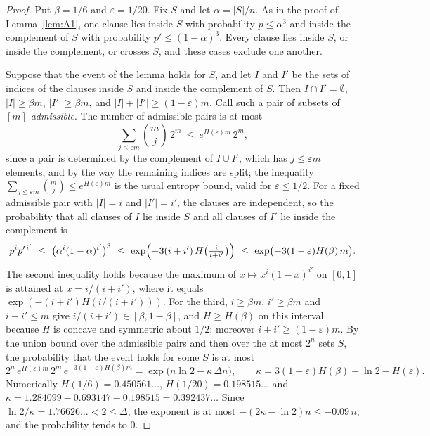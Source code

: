 \documentclass[11pt,a4paper]{article}
\theoremstyle{definition}
\theoremstyle{remark}
\begin{document}
\begin{proof}
Put $\beta=1/6$ and $\varepsilon=1/20$. Fix $S$ and let $\alpha=|S|/n$. As in the proof of
Lemma~\ref{lem:A1}, one clause lies inside $S$ with probability $p\le\alpha^3$ and inside
the complement of $S$ with probability $p'\le(1-\alpha)^3$. Every clause lies inside $S$,
or inside the complement, or crosses $S$, and these cases exclude one another.

Suppose that the event of the lemma holds for $S$, and let $I$ and $I'$ be the sets of
indices of the clauses inside $S$ and inside the complement of $S$. Then $I\cap I'=\emptyset$,
$|I|\ge\beta m$, $|I'|\ge\beta m$, and $|I|+|I'|\ge(1-\varepsilon)m$. Call such a pair of
subsets of $[m]$ \emph{admissible}. The number of admissible pairs is at most
\[
\sum_{j\le\varepsilon m}\binom mj\,2^{m}\ \le\ e^{H(\varepsilon)m}\,2^m ,
\]
since a pair is determined by the complement of $I\cup I'$, which has $j\le\varepsilon m$
elements, and by the way the remaining indices are split; the inequality
$\sum_{j\le\varepsilon m}\binom mj\le e^{H(\varepsilon)m}$ is the usual entropy bound, valid
for $\varepsilon\le1/2$. For a fixed admissible pair with $|I|=i$ and $|I'|=i'$, the clauses
are independent, so the probability that all clauses of $I$ lie inside $S$ and all clauses
of $I'$ lie inside the complement is
\[
p^{i}p'^{\,i'}\ \le\ \bigl(\alpha^{i}(1-\alpha)^{i'}\bigr)^3\ \le\
\exp\Bigl(-3(i+i')\,H\bigl(\tfrac{i}{i+i'}\bigr)\Bigr)\ \le\
\exp\bigl(-3(1-\varepsilon)H(\beta)\,m\bigr).
\]
The second inequality holds because the maximum of $x\mapsto x^i(1-x)^{i'}$ on $[0,1]$ is
attained at $x=i/(i+i')$, where it equals $\exp(-(i+i')H(i/(i+i')))$. For the third,
$i\ge\beta m$, $i'\ge\beta m$ and $i+i'\le m$ give $i/(i+i')\in[\beta,1-\beta]$, and
$H\ge H(\beta)$ on this interval because $H$ is concave and symmetric about $1/2$; moreover
$i+i'\ge(1-\varepsilon)m$. By the union bound over the admissible pairs and then over the at
most $2^n$ sets $S$, the probability that the event holds for some $S$ is at most
\[
2^n\,e^{H(\varepsilon)m}\,2^m\,e^{-3(1-\varepsilon)H(\beta)m}
=\exp\bigl(n\ln2-\kappa\,\Delta n\bigr),\qquad
\kappa=3(1-\varepsilon)H(\beta)-\ln2-H(\varepsilon).
\]
Numerically $H(1/6)=0.450561\ldots$, $H(1/20)=0.198515\ldots$ and
$\kappa=1.284099-0.693147-0.198515=0.392437\ldots$ Since $\ln2/\kappa=1.76626\ldots<2\le\Delta$,
the exponent is at most $-(2\kappa-\ln2)n\le-0.09\,n$, and the probability tends to $0$.
\end{proof}
\end{document}
